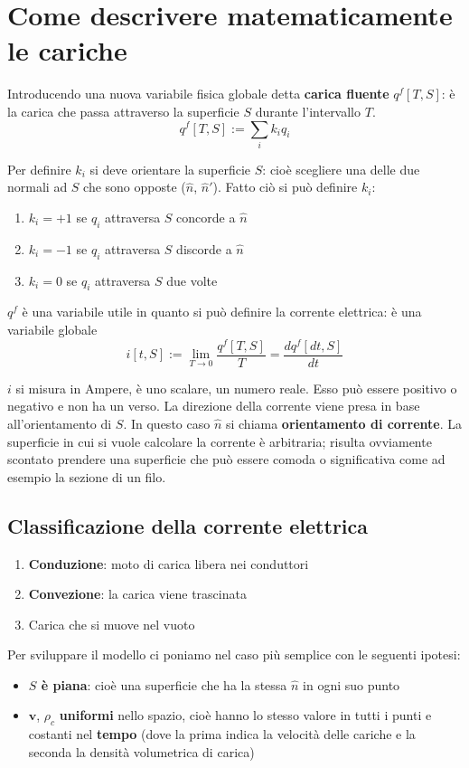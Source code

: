 \section{Come descrivere matematicamente le cariche}
Introducendo una nuova variabile fisica globale detta \textbf{carica fluente} $q^f[T,S]$: è la carica che passa attraverso la superficie $S$ durante l'intervallo $T$.
\[
q^f[T,S] := \sum_i k_i q_i
\]

Per definire $k_i$ si deve orientare la superficie $S$: cioè scegliere una delle due normali ad $S$ che sono opposte ($\hat{n}$, $\hat{n}'$). Fatto ciò si può definire $k_i$:
\begin{enumerate}
    \item $k_i = +1$ se $q_i$ attraversa $S$ concorde a $\hat{n}$
    \item $k_i = -1$ se $q_i$ attraversa $S$ discorde a $\hat{n}$
    \item $k_i = 0$ se $q_i$ attraversa $S$ due volte
\end{enumerate}

$q^f$ è una variabile utile in quanto si può definire la corrente elettrica: è una variabile globale
\[
i[t,S] := \lim_{T \to 0} \frac{q^f[T,S]}{T} = \frac{dq^f[dt,S]}{dt}
\]

$i$ si misura in Ampere, è uno scalare, un numero reale. Esso può essere positivo o negativo e non ha un verso. La direzione della corrente viene presa in base all'orientamento di $S$. In questo caso $\hat{n}$ si chiama \textbf{orientamento di corrente}. La superficie in cui si vuole calcolare la corrente è arbitraria; risulta ovviamente scontato prendere una superficie che può essere comoda o significativa come ad esempio la sezione di un filo.

\subsection{Classificazione della corrente elettrica}
\begin{enumerate}
    \item \textbf{Conduzione}: moto di carica libera nei conduttori
    \item \textbf{Convezione}: la carica viene trascinata
    \item Carica che si muove nel vuoto
\end{enumerate}

Per sviluppare il modello ci poniamo nel caso più semplice con le seguenti ipotesi:
\begin{itemize}
    \item \textbf{$S$ è piana}: cioè una superficie che ha la stessa $\hat{n}$ in ogni suo punto
    \item $\mathbf{v}$, $\rho_c$ \textbf{uniformi} nello spazio, cioè hanno lo stesso valore in tutti i punti e costanti nel \textbf{tempo} (dove la prima indica la velocità delle cariche e la seconda la densità volumetrica di carica)
\end{itemize}

